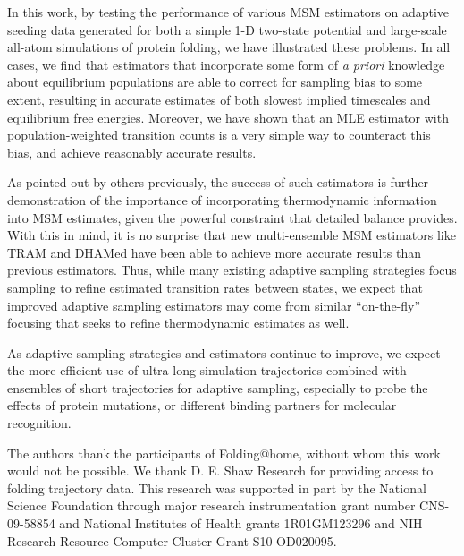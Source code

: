 \documentclass[%
 aip,
rsi,%
 amsmath,amssymb,
 reprint,%
]{revtex4-1}
\begin{document}
In this work, by testing the performance of various MSM estimators on adaptive seeding data generated for both a simple 1-D two-state potential and large-scale all-atom simulations of protein folding, we have illustrated these problems.  In all cases, we find that estimators that incorporate some form of \textit{a priori} knowledge about equilibrium populations are able to correct for sampling bias to some extent, resulting in accurate estimates of both slowest implied timescales and equilibrium free energies.  Moreover, we have shown that an MLE estimator with population-weighted transition counts is a very simple way to counteract this bias, and achieve reasonably accurate results.

As pointed out by others previously,\cite{trendelkamp2016efficient} the success of such estimators is further demonstration of the importance of incorporating thermodynamic information into MSM estimates, given the powerful constraint that detailed balance provides.  With this in mind, it is no surprise that new multi-ensemble MSM estimators like TRAM\cite{Wu:2016fk} and DHAMed\cite{Stelzl:2017gra} have been able to achieve more accurate results than previous estimators. Thus, while many existing adaptive sampling strategies focus sampling to refine estimated transition rates between states, we expect that improved adaptive sampling estimators may come from similar ``on-the-fly'' focusing that seeks to refine thermodynamic estimates as well.  

As adaptive sampling strategies and estimators continue to improve, we expect the more efficient use of ultra-long simulation trajectories combined with ensembles of short trajectories for adaptive sampling, especially to probe the effects of protein mutations, or different binding partners for molecular recognition.


\begin{acknowledgments}
The authors thank the participants of Folding@home, without whom this work would not be possible.  We thank D. E. Shaw Research for providing access to folding trajectory data. This research was supported in part by the National Science Foundation through major research instrumentation grant number CNS-09-58854 and National Institutes of Health grants 1R01GM123296 and NIH Research Resource Computer Cluster Grant S10-OD020095.
\end{acknowledgments}

%


\end{document}
